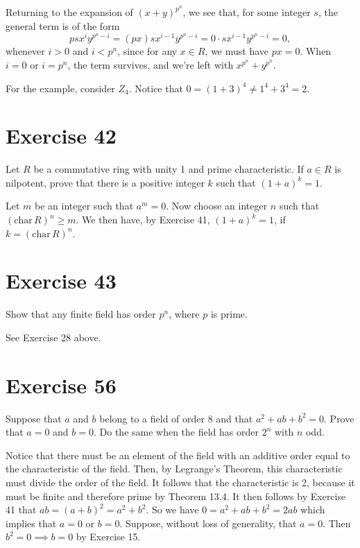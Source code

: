 \documentclass[12pt]{article}
\newcommand{\chr}{\mbox{char}\,}
\begin{document}
Returning to the expansion of $(x+y)^{p^n}$, we see that, for some
integer $s$, the general term is of the form
\begin{equation*}
psx^iy^{p^n-i}=(px)sx^{i-1}y^{p^n-i}=0\cdot sx^{i-1}y^{p^n-i}=0,
\end{equation*}
whenever $i>0$ and $i<p^n$, since for any $x\in R$, we must have $px=0$.
When $i=0$ or $i=p^n$, the term survives, and we're left with $x^{p^n}+y^{p^n}$.

For the example, consider $Z_4$.  Notice that $0=(1+3)^4\neq 1^4+3^4=2$.

\section*{Exercise 42}

Let $R$ be a commutative ring with unity 1 and prime characteristic.  If
$a\in R$ is nilpotent, prove that there is a positive integer $k$ such that
$(1+a)^k=1$.

Let $m$ be an integer such that $a^m=0$.
Now choose an integer $n$ such that $(\chr R)^n\geq m$.
We then have, by Exercise 41, $(1+a)^k=1$, if $k=(\chr R)^n$.

\section*{Exercise 43}

Show that any finite field has order $p^n$, where $p$ is prime.

See Exercise 28 above.

\section*{Exercise 56}

Suppose that $a$ and $b$ belong to a field of order 8 and that $a^2+ab+b^2=0$.
Prove that $a=0$ and $b=0$.  Do the same when the field has order $2^n$ with $n$ odd.

Notice that there must be an element of the field with an additive order equal to
the characteristic of the field.  Then, by Legrange's Theorem, this characteristic
must divide the order of the field.  It follows that the characteristic is 2, because
it must be finite and therefore prime by Theorem 13.4.  It then
follows by Exercise 41 that $ab=(a+b)^2=a^2+b^2$.
So we have $0=a^2+ab+b^2=2ab$ which implies that $a=0$ or $b=0$.
Suppose, without loss of generality, that $a=0$.  Then $b^2=0\implies b=0$
by Exercise 15.
\end{document}
